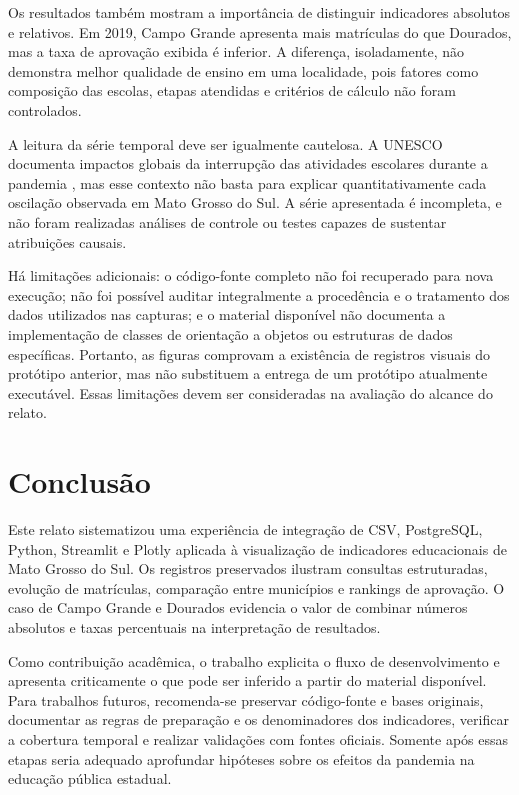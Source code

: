 \documentclass[preprint,10pt,5p]{elsarticle}
\begin{document}
Os resultados também mostram a importância de distinguir indicadores absolutos e relativos. Em 2019, Campo Grande apresenta mais matrículas do que Dourados, mas a taxa de aprovação exibida é inferior. A diferença, isoladamente, não demonstra melhor qualidade de ensino em uma localidade, pois fatores como composição das escolas, etapas atendidas e critérios de cálculo não foram controlados.

A leitura da série temporal deve ser igualmente cautelosa. A UNESCO documenta impactos globais da interrupção das atividades escolares durante a pandemia \citep{unesco_pandemia}, mas esse contexto não basta para explicar quantitativamente cada oscilação observada em Mato Grosso do Sul. A série apresentada é incompleta, e não foram realizadas análises de controle ou testes capazes de sustentar atribuições causais.

Há limitações adicionais: o código-fonte completo não foi recuperado para nova execução; não foi possível auditar integralmente a procedência e o tratamento dos dados utilizados nas capturas; e o material disponível não documenta a implementação de classes de orientação a objetos ou estruturas de dados específicas. Portanto, as figuras comprovam a existência de registros visuais do protótipo anterior, mas não substituem a entrega de um protótipo atualmente executável. Essas limitações devem ser consideradas na avaliação do alcance do relato.

\section{Conclusão}
Este relato sistematizou uma experiência de integração de CSV, PostgreSQL, Python, Streamlit e Plotly aplicada à visualização de indicadores educacionais de Mato Grosso do Sul. Os registros preservados ilustram consultas estruturadas, evolução de matrículas, comparação entre municípios e rankings de aprovação. O caso de Campo Grande e Dourados evidencia o valor de combinar números absolutos e taxas percentuais na interpretação de resultados.

Como contribuição acadêmica, o trabalho explicita o fluxo de desenvolvimento e apresenta criticamente o que pode ser inferido a partir do material disponível. Para trabalhos futuros, recomenda-se preservar código-fonte e bases originais, documentar as regras de preparação e os denominadores dos indicadores, verificar a cobertura temporal e realizar validações com fontes oficiais. Somente após essas etapas seria adequado aprofundar hipóteses sobre os efeitos da pandemia na educação pública estadual.
\end{document}
